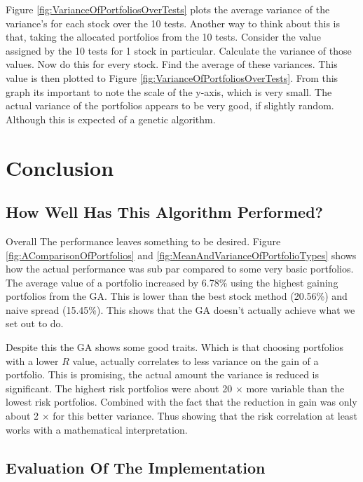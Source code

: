 \documentclass[11pt]{article}
\begin{document}
    Figure \ref{fig:VarianceOfPortfoliosOverTests} plots the average variance of the variance's for
    each stock over the 10 tests. Another way to think about this is that, taking the allocated
    portfolios from the 10 tests. Consider the value assigned by the 10 tests for 1 stock in
    particular. Calculate the variance of those values. Now do this for every stock. Find the
    average of these variances. This value is then plotted to Figure
    \ref{fig:VarianceOfPortfoliosOverTests}. From this graph its important to note the scale of
    the y-axis, which is very small. The actual variance of the portfolios appears to be very
    good, if slightly random. Although this is expected of a genetic algorithm.

\section{Conclusion}

\subsection{How Well Has This Algorithm Performed?}

    Overall The performance leaves something to be desired. Figure
    \ref{fig:AComparisonOfPortfolios} and \ref{fig:MeanAndVarianceOfPortfolioTypes}
    shows how the actual performance was
    sub par compared to some very basic portfolios. The average value of a portfolio
    increased by 6.78\% using the highest gaining portfolios from the GA. This is lower
    than the best stock method (20.56\%) and naive spread (15.45\%). This shows
    that the GA doesn't actually achieve what we set out to do.

    Despite this the GA shows some good traits. Which is that choosing portfolios
    with a lower \(R\) value, actually correlates to less variance on the gain
    of a portfolio. This is promising, the actual amount the variance is reduced
    is significant. The highest risk portfolios were about 20 \(\times\) more
    variable than the lowest risk portfolios. Combined with the fact that the
    reduction in gain was only about 2 \(\times\) for this better
    variance. Thus showing that the risk correlation at least works with a mathematical
    interpretation.

\subsection{Evaluation Of The Implementation}
\end{document}
